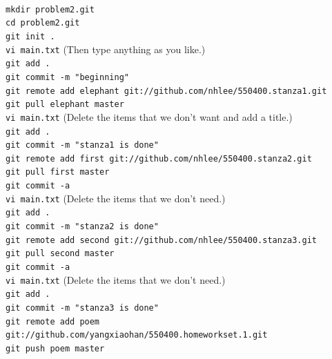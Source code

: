 \documentclass[12pt]{article}
\begin{document}
\\
\verb+mkdir problem2.git+\\
\verb+cd problem2.git+\\
\verb+git init .+\\
\verb+vi main.txt+ (Then type anything as you like.)\\
\verb+git add .+\\
\verb+git commit -m "beginning"+\\
\verb+git remote add elephant git://github.com/nhlee/550400.stanza1.git+\\
\verb+git pull elephant master+\\
\verb+vi main.txt+ (Delete the items that we don't want and add a title.)\\
\verb+git add .+\\
\verb+git commit -m "stanza1 is done"+\\
\verb+git remote add first git://github.com/nhlee/550400.stanza2.git+\\
\verb+git pull first master+\\
\verb+git commit -a+\\
\verb+vi main.txt+ (Delete the items that we don't need.)\\
\verb+git add .+\\
\verb+git commit -m "stanza2 is done"+\\
\verb+git remote add second git://github.com/nhlee/550400.stanza3.git+\\
\verb+git pull second master+\\
\verb+git commit -a+\\
\verb+vi main.txt+ (Delete the items that we don't need.)\\
\verb+git add .+\\
\verb+git commit -m "stanza3 is done"+\\
\verb+git remote add poem git://github.com/yangxiaohan/550400.homeworkset.1.git+\\
\verb+git push poem master+\\
\end{document}
